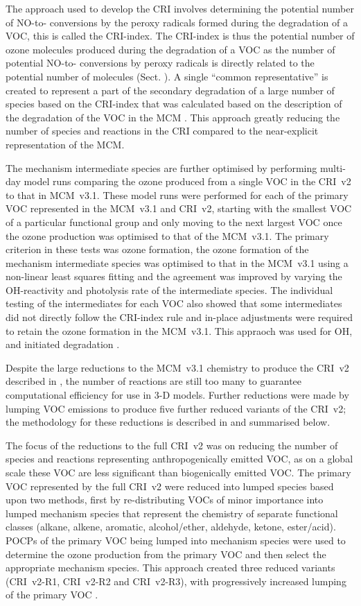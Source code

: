 The approach used to develop the CRI involves determining the potential number of NO-to- conversions by the peroxy radicals formed during the degradation of a VOC, this is called the CRI-index.
The CRI-index is thus the potential number of ozone molecules produced during the degradation of a VOC as the number of potential NO-to- conversions by peroxy radicals is directly related to the potential number of  molecules (Sect. ).
A single ``common representative'' is created to represent a part of the secondary degradation of a large number of species based on the CRI-index that was calculated based on the description of the degradation of the VOC in the MCM \citep{Jenkin:2008}.
This approach greatly reducing the number of species and reactions in the CRI compared to the near-explicit representation of the MCM.

The mechanism intermediate species are further optimised by performing multi-day model runs comparing the ozone produced from a single VOC in the CRI~v2 to that in MCM~v3.1.
These model runs were performed for each of the primary VOC represented in the MCM~v3.1 and CRI~v2, starting with the smallest VOC of a particular functional group and only moving to the next largest VOC once the ozone production was optimised to that of the MCM~v3.1.
The primary criterion in these tests was ozone formation, the ozone formation of the mechanism intermediate species was optimised to that in the MCM~v3.1 using a non-linear least squares fitting and the agreement was improved by varying the OH-reactivity and photolysis rate of the intermediate species.
The individual testing of the intermediates for each VOC also showed that some intermediates did not directly follow the CRI-index rule and in-place adjustments were required to retain the ozone formation in the MCM~v3.1.
This appraoch was used for OH,  and  initiated degradation \citep{Jenkin:2008}.

Despite the large reductions to the MCM~v3.1 chemistry to produce the CRI~v2 described in \citet{Jenkin:2008}, the number of reactions are still too many to guarantee computational efficiency for use in 3-D models.
Further reductions were made by lumping VOC emissions to produce five further reduced variants of the CRI~v2; the methodology for these reductions is described in \citet{Watson:2008} and summarised below.

The focus of the reductions to the full CRI~v2 was on reducing the number of species and reactions representing anthropogenically emitted VOC, as on a global scale these VOC are less significant than biogenically emitted VOC.
The primary VOC represented by the full CRI~v2 were reduced into lumped species based upon two methods, first by re-distributing VOCs of minor importance into lumped mechanism species that represent the chemistry of separate functional classes (alkane, alkene, aromatic, alcohol/ether, aldehyde, ketone, ester/acid).
POCPs of the primary VOC being lumped into mechanism species were used to determine the ozone production from the primary VOC and then select the appropriate mechanism species.
This approach created three reduced variants (CRI~v2-R1, CRI~v2-R2 and CRI~v2-R3), with progressively increased lumping of the primary VOC \citep{Watson:2008}.

